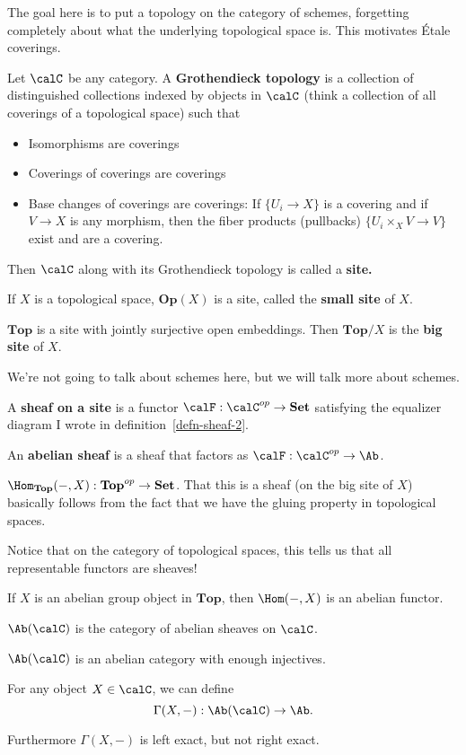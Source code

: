 \documentclass[12pt]{article}
\begin{document}
The goal here is to put a topology on the category of schemes, forgetting completely about what the underlying topological space is. This motivates \'Etale coverings.

\begin{defn}
	Let $\calC$ be any category. A \textbf{Grothendieck topology} is a collection of distinguished collections indexed by objects in $\calC$ (think a collection of all coverings of a topological space)
	such that 
	\begin{itemize}
		\item Isomorphisms are coverings
		\item Coverings of coverings are coverings 
		\item Base changes of coverings are coverings: If $\{U_i\to X\}$ is a covering and if $V\to X$ is any morphism,
		then the fiber products (pullbacks) $\{U_i\times_XV\to V\}$ exist and are a covering.
	\end{itemize}
	Then $\calC$ along with its Grothendieck topology is called a \textbf{site.}
\end{defn}
\begin{ex}
	If $X$ is a topological space, $\mathbf{Op}(X)$ is a site, called the \textbf{small site} of $X$.

	$\mathbf{Top}$ is a site with jointly surjective open embeddings. Then $\mathbf{Top}/X$ is the \textbf{big site} of $X$.
\end{ex}

We're not going to talk about schemes here, but we will talk more about schemes.

\begin{defn}
	A \textbf{sheaf on a site} is a functor $\calF:\calC^{op}\to\mathbf{Set}$ satisfying the equalizer 
	diagram I wrote in definition~\ref{defn-sheaf-2}.

	An \textbf{abelian sheaf} is a sheaf that factors as $\calF:\calC^{op}\to\Ab$.
\end{defn}
\begin{ex}
	$\Hom_{\mathbf{Top}}(-,X):\mathbf{Top}^{op}\to\mathbf{Set}$. That this is a sheaf (on the big site of $X$) basically follows from the fact that 
	we have the gluing property in topological spaces.
\end{ex}
\begin{rmk}
	Notice that on the category of topological spaces, this tells us that all representable functors are sheaves!
\end{rmk}
\begin{ex}
	If $X$ is an abelian group object in $\mathbf{Top}$, then $\Hom(-,X)$ is an abelian functor.
\end{ex}
\begin{defn}
	$\Ab(\calC)$ is the category of abelian sheaves on $\calC$. 
\end{defn}
\begin{thm}
	$\Ab(\calC)$ is an abelian category with enough injectives.
\end{thm}
\begin{prop}
	For any object $X\in \calC$, we can define 
	\[\Gamma(X,-):\Ab(\calC)\to \Ab.\]

	Furthermore $\Gamma(X,-)$ is left exact, but not right exact.
\end{prop}
\end{document}
